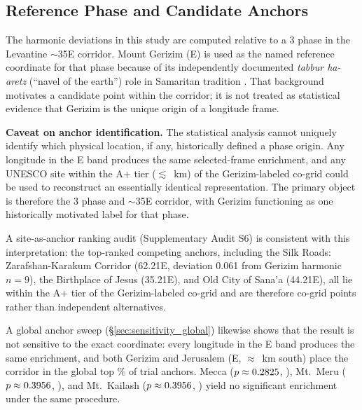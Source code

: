 \subsection{Reference Phase and Candidate Anchors}
\label{sec:anchor}

The harmonic deviations in this study are computed relative to a
3\textdegree{} phase in the Levantine $\sim$35\textdegree{}E corridor.
Mount Gerizim (\GerizimLon\textdegree{}E) is used as the named reference
coordinate for that phase because of its independently documented
\textit{tabbur ha-aretz} (``navel of the earth'') role in Samaritan
tradition \citep{purvis1968,macdonald1964,crown1989}. That background
motivates a candidate point within the corridor; it is not treated as
statistical evidence that Gerizim is the unique origin of a longitude
frame.

\textbf{Caveat on anchor identification.}
The statistical analysis cannot uniquely identify which physical
location, if any, historically defined a phase origin. Any longitude in
the \xbandLabel\textdegree{}E band produces the same selected-frame
enrichment, and any UNESCO site within the A+ tier
($\lesssim$\ApThreshKm{}~km) of the Gerizim-labeled co-grid could be used
to reconstruct an essentially identical representation. The primary
object is therefore the 3\textdegree{} phase and $\sim$35\textdegree{}E
corridor, with Gerizim functioning as one historically motivated label
for that phase.

A site-as-anchor ranking audit (Supplementary Audit S6) is consistent
with this interpretation: the top-ranked competing anchors, including
the Silk Roads: Zarafshan-Karakum Corridor (62.21\textdegree{}E,
deviation 0.061\textdegree{} from Gerizim harmonic $n=9$), the
Birthplace of Jesus (35.21\textdegree{}E), and Old City of Sana'a
(44.21\textdegree{}E), all lie within the A+ tier of the Gerizim-labeled co-grid
and are therefore co-grid points rather than independent alternatives.

A global anchor sweep (\S\ref{sec:sensitivity_global}) likewise shows
that the result is not sensitive to the exact coordinate: every
longitude in the \xbandLabel\textdegree{}E band produces the same
enrichment, and both Gerizim and Jerusalem
(\JerusalemLon\textdegree{}E, $\approx$\GerizimJerusalemKm~km south)
place the corridor in the global top \anchorSweepTopPct\% of
\anchorSweepNanchors{} trial anchors. Mecca ($p \approx 0.2825$,
\pMeccaAnchorSig{}), Mt.\ Meru ($p \approx 0.3956$,
\pMeruAnchorSig{}), and Mt.\ Kailash ($p \approx 0.3956$,
\pKailashAnchorSig{}) yield no significant enrichment under the same
procedure.

